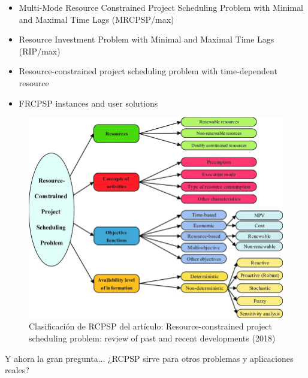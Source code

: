 \begin{itemize}
\begin{itemize}
    \item Multi-Mode Resource Constrained Project Scheduling Problem with Minimal and Maximal Time Lags (MRCPSP/max)

    \item Resource Investment Problem with Minimal and Maximal Time Lags (RIP/max)

    \item Resource-constrained project scheduling problem with time-dependent resource 

    \item FRCPSP instances and user solutions

\end{itemize}
\end{itemize}



\begin{figure}
    \centering
    \includegraphics[scale=0.5]{Figures/Classification-of-resource-constrained-project-scheduling-problems.png}
    \caption{Clasificación de RCPSP del artículo: Resource-constrained project scheduling problem: review of past and recent developments (2018)}
    \label{fig:Classification}
\end{figure}




Y ahora la gran pregunta...
¿RCPSP sirve para otros problemas y aplicaciones reales?

